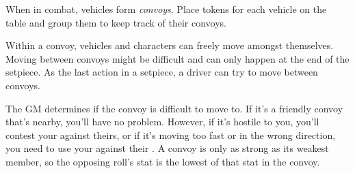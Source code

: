 
When in combat, vehicles form \emph{convoys}. Place tokens for each vehicle on the table and group them to keep track of their convoys.

Within a convoy, vehicles and characters can freely move amongst themselves. Moving between convoys might be difficult and can only happen at the end of the setpiece. As the last action in a setpiece, a driver can try to move between convoys.

The GM determines if the convoy is difficult to move to. If it's a friendly convoy that's nearby, you'll have no problem. However, if it's hostile to you, you'll contest your  against theirs, or if it's moving too fast or in the wrong direction, you need to use your  against their . A convoy is only as strong as its weakest member, so the opposing roll's stat is the lowest of that stat in the convoy.

